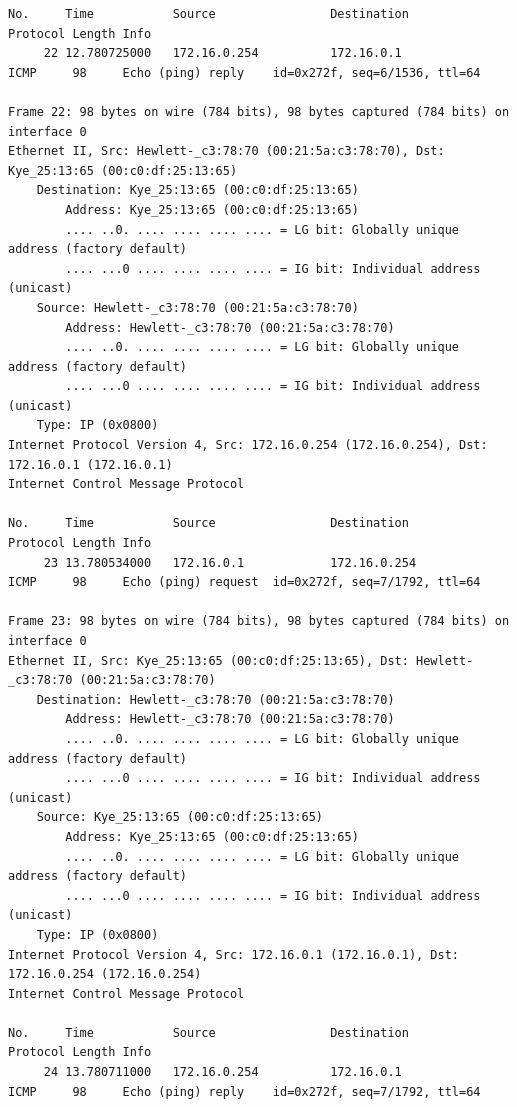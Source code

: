 \documentclass[a4paper,11pt]{article}
\begin{document}
\begin{lstlisting}
No.     Time           Source                Destination           Protocol Length Info
     22 12.780725000   172.16.0.254          172.16.0.1            ICMP     98     Echo (ping) reply    id=0x272f, seq=6/1536, ttl=64

Frame 22: 98 bytes on wire (784 bits), 98 bytes captured (784 bits) on interface 0
Ethernet II, Src: Hewlett-_c3:78:70 (00:21:5a:c3:78:70), Dst: Kye_25:13:65 (00:c0:df:25:13:65)
    Destination: Kye_25:13:65 (00:c0:df:25:13:65)
        Address: Kye_25:13:65 (00:c0:df:25:13:65)
        .... ..0. .... .... .... .... = LG bit: Globally unique address (factory default)
        .... ...0 .... .... .... .... = IG bit: Individual address (unicast)
    Source: Hewlett-_c3:78:70 (00:21:5a:c3:78:70)
        Address: Hewlett-_c3:78:70 (00:21:5a:c3:78:70)
        .... ..0. .... .... .... .... = LG bit: Globally unique address (factory default)
        .... ...0 .... .... .... .... = IG bit: Individual address (unicast)
    Type: IP (0x0800)
Internet Protocol Version 4, Src: 172.16.0.254 (172.16.0.254), Dst: 172.16.0.1 (172.16.0.1)
Internet Control Message Protocol

No.     Time           Source                Destination           Protocol Length Info
     23 13.780534000   172.16.0.1            172.16.0.254          ICMP     98     Echo (ping) request  id=0x272f, seq=7/1792, ttl=64

Frame 23: 98 bytes on wire (784 bits), 98 bytes captured (784 bits) on interface 0
Ethernet II, Src: Kye_25:13:65 (00:c0:df:25:13:65), Dst: Hewlett-_c3:78:70 (00:21:5a:c3:78:70)
    Destination: Hewlett-_c3:78:70 (00:21:5a:c3:78:70)
        Address: Hewlett-_c3:78:70 (00:21:5a:c3:78:70)
        .... ..0. .... .... .... .... = LG bit: Globally unique address (factory default)
        .... ...0 .... .... .... .... = IG bit: Individual address (unicast)
    Source: Kye_25:13:65 (00:c0:df:25:13:65)
        Address: Kye_25:13:65 (00:c0:df:25:13:65)
        .... ..0. .... .... .... .... = LG bit: Globally unique address (factory default)
        .... ...0 .... .... .... .... = IG bit: Individual address (unicast)
    Type: IP (0x0800)
Internet Protocol Version 4, Src: 172.16.0.1 (172.16.0.1), Dst: 172.16.0.254 (172.16.0.254)
Internet Control Message Protocol

No.     Time           Source                Destination           Protocol Length Info
     24 13.780711000   172.16.0.254          172.16.0.1            ICMP     98     Echo (ping) reply    id=0x272f, seq=7/1792, ttl=64


\end{lstlisting}
\end{document}
